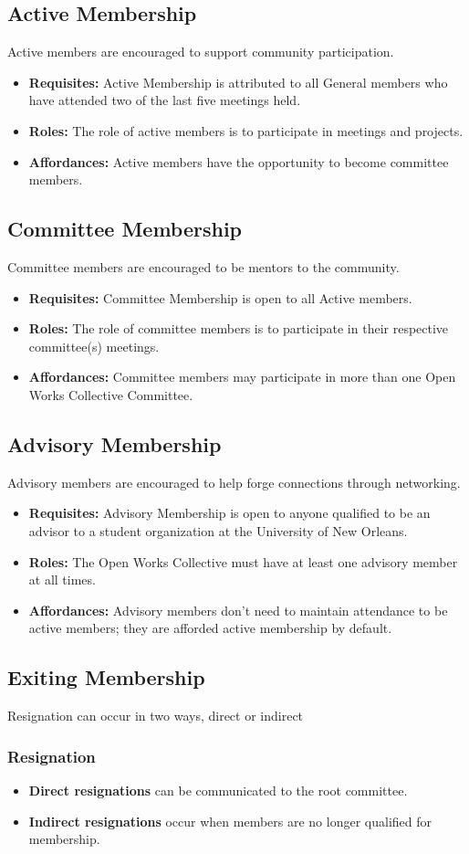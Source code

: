 \documentclass{article}
\newcommand{\asection}[1]{\subsection{#1} \label{#1}}
\newcommand{\asubsection}[1]{\subsubsection{#1} \label{#1}}
\begin{document}
\asection{Active Membership}
Active members are encouraged to support community participation.
\begin{itemize}
	\item \textbf{Requisites:} Active Membership is attributed to all General members who have attended two of the last five meetings held.
	\item \textbf{Roles:} The role of active members is to participate in meetings and projects.
	\item \textbf{Affordances:} Active members have the opportunity to become committee members.
\end{itemize}

\asection{Committee Membership}
Committee members are encouraged to be mentors to the community.
\begin{itemize}
	\item \textbf{Requisites:} Committee Membership is open to all Active members. 
	\item \textbf{Roles:} The role of committee members is to participate in their respective committee(s) meetings. 
	\item \textbf{Affordances:} Committee members may participate in more than one Open Works Collective Committee.
\end{itemize}

\asection{Advisory Membership}
Advisory members are encouraged to help forge connections through networking.
\begin{itemize}
	\item \textbf{Requisites:} Advisory Membership is open to anyone qualified to be an advisor to a student organization at the University of New Orleans.
	\item \textbf{Roles:} The Open Works Collective must have at least one advisory member at all times.
	\item \textbf{Affordances:} Advisory members don't need to maintain attendance to be active members; they are afforded active membership by default. %
\end{itemize}

\asection{Exiting Membership}
Resignation can occur in two ways, direct or indirect
\asubsection{Resignation}
\begin{itemize}
	\item \textbf{Direct resignations} can be communicated to the root committee.
	\item \textbf{Indirect resignations} occur when members are no longer qualified for membership.
\end{itemize}
\end{document}
